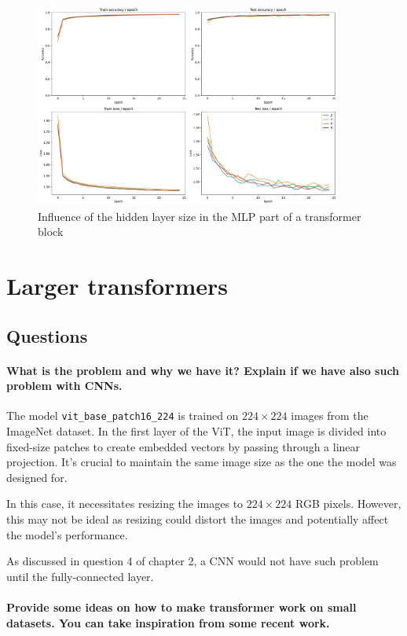 \begin{figure}[H]
    \centering
    \includegraphics*[width=0.9\textwidth]{figs/Transformers/mlp_ratio_influence_25.pdf}
    \caption{Influence of the hidden layer size in the MLP part of a transformer block}
    \label{fig:mlp_ratio_influence}
\end{figure}

\section{Larger transformers}
\subsection{Questions}
\paragraph{What is the problem and why we have it? Explain if we have also such problem with CNNs.}
The model \texttt{vit\_base\_patch16\_224} is trained on $224 \times 224$ images from the ImageNet dataset. In the first layer of the ViT, the input image is divided into fixed-size patches to create embedded vectors by passing through a linear projection. It's crucial to maintain the same image size as the one the model was designed for.

In this case, it necessitates resizing the images to $224 \times 224$ RGB pixels. However, this may not be ideal as resizing could distort the images and potentially affect the model's performance.

As discussed in question 4 of chapter 2, a CNN would not have such problem until the fully-connected layer.

\paragraph{Provide some ideas on how to make transformer work on small datasets. You can take inspiration from some recent work.}

